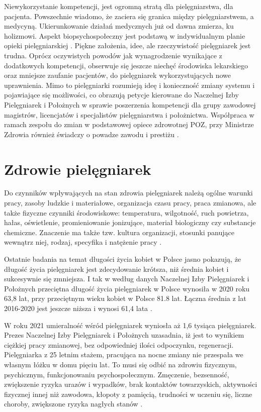 \documentclass[a4paper,12pt,twoside,openany]{report}
\begin{document}
Niewykorzystanie  kompetencji, jest ogromną stratą dla pielęgniarstwa, dla pacjenta. Powszechnie wiadomo, że zaciera się granica między pielęgniarstwem, a medycyną. Ukierunkowanie działań medycznych już od dawna zmierza, ku holizmowi. Aspekt biopsychospołeczny jest podstawą w indywidualnym planie opieki pielęgniarskiej \cite{dorota}. Piękne założenia, idee, ale rzeczywistość pielęgniarek jest trudna. Oprócz oczywistych powodów jak wynagrodzenie wynikające z dodatkowych kompetencji, obserwuje się jeszcze niechęć środowiska lekarskiego oraz mniejsze zaufanie pacjentów, do pielęgniarek wykorzystujących nowe uprawnienia. Mimo to pielęgniarki rozumieją ideę i konieczność zmiany systemu i  pojawiające się możliwości, co obrazują petycje kierowane do Naczelnej Izby Pielęgniarek i Położnych w sprawie poszerzenia kompetencji dla grupy zawodowej magistrów, licencjatów i specjalistów pielęgniarstwa i położnictwa\cite{petycja}. Współpraca w ramach zespołu do zmian w podstawowej opiece zdrowotnej POZ, przy Ministrze Zdrowia również świadczy o powadze zawodu i prestiżu \cite{poz}.

\section{Zdrowie pielęgniarek}
\label{sectionZdrowiePielegniarek}
Do czynników wpływających na stan zdrowia pielęgniarek należą ogólne warunki pracy, zasoby ludzkie i materiałowe, organizacja czasu pracy,  praca zmianowa, ale także fizyczne czynniki środowiskowe: temperatura, wilgotność, ruch powietrza, hałas, oświetlenie, promieniowanie jonizujące, materiał biologiczny czy substancje chemiczne. Znaczenie ma także tzw. kultura organizacji, stosunki panujące wewnątrz niej, rodzaj, specyfika i natężenie pracy \cite{obciążenia}.

Ostatnie badania na temat długości życia kobiet w Polsce jasno pokazują, że długość życia pielęgniarek jest zdecydowanie krótsza, niż średnia kobiet i sukcesywnie się zmniejsza. I tak w według danych Naczelnej Izby Pielęgniarek i Położnych przeciętna długość życia pielęgniarek w Polsce wynosiła w 2020 roku 63,8 lat, przy przeciętnym wieku kobiet w Polsce 81.8 lat. Łączna średnia z lat 2016-2020 jest jeszcze niższa i wynosi 61,4 lata \cite{statystyka}.

W roku 2021 umieralność wśród pielęgniarek wyniosła aż 1,6 tysiąca pielęgniarek. Prezes Naczelnej Izby Pielęgniarek i Położnych uzasadnia, iż jest to wynikiem ciężkiej pracy zmianowej, bez odpowiedniej ilości odpoczynku, regeneracji. Pielęgniarka z 25 letnim stażem, pracująca na nocne zmiany nie przespała we własnym łóżku w domu pięciu lat. To musi się odbić na zdrowiu fizycznym, psychicznym, funkcjonowaniu psychospołecznym. Zmęczenie, bezsenność, zwiększenie ryzyka urazów i wypadków, brak kontaktów towarzyskich, aktywności fizycznej innej niż zawodowa, kłopoty z pamięcią, trudności w uczeniu się, liczne choroby, zwiększone ryzyka nagłych stanów \cite{zgony}.
\end{document}
